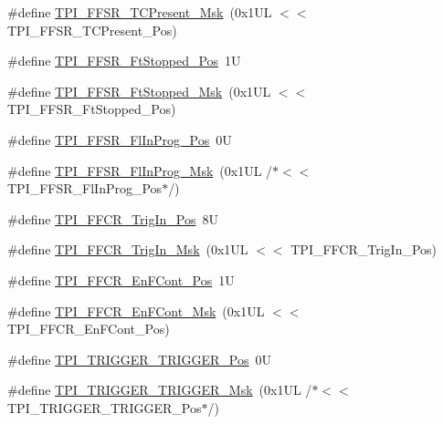 \begin{DoxyCompactItemize}
\item 
\#define \hyperlink{group___c_m_s_i_s___t_p_i_ga0d6bfd263ff2fdec72d6ec9415fb1135}{T\+P\+I\+\_\+\+F\+F\+S\+R\+\_\+\+T\+C\+Present\+\_\+\+Msk}~(0x1\+U\+L $<$$<$ T\+P\+I\+\_\+\+F\+F\+S\+R\+\_\+\+T\+C\+Present\+\_\+\+Pos)
\item 
\#define \hyperlink{group___c_m_s_i_s___t_p_i_gaedf31fd453a878021b542b644e2869d2}{T\+P\+I\+\_\+\+F\+F\+S\+R\+\_\+\+Ft\+Stopped\+\_\+\+Pos}~1U
\item 
\#define \hyperlink{group___c_m_s_i_s___t_p_i_ga1ab6c3abe1cf6311ee07e7c479ce5f78}{T\+P\+I\+\_\+\+F\+F\+S\+R\+\_\+\+Ft\+Stopped\+\_\+\+Msk}~(0x1\+U\+L $<$$<$ T\+P\+I\+\_\+\+F\+F\+S\+R\+\_\+\+Ft\+Stopped\+\_\+\+Pos)
\item 
\#define \hyperlink{group___c_m_s_i_s___t_p_i_ga542ca74a081588273e6d5275ba5da6bf}{T\+P\+I\+\_\+\+F\+F\+S\+R\+\_\+\+Fl\+In\+Prog\+\_\+\+Pos}~0U
\item 
\#define \hyperlink{group___c_m_s_i_s___t_p_i_ga63dfb09259893958962914fc3a9e3824}{T\+P\+I\+\_\+\+F\+F\+S\+R\+\_\+\+Fl\+In\+Prog\+\_\+\+Msk}~(0x1\+U\+L /$\ast$$<$$<$ T\+P\+I\+\_\+\+F\+F\+S\+R\+\_\+\+Fl\+In\+Prog\+\_\+\+Pos$\ast$/)
\item 
\#define \hyperlink{group___c_m_s_i_s___t_p_i_gaa7ea11ba6ea75b541cd82e185c725b5b}{T\+P\+I\+\_\+\+F\+F\+C\+R\+\_\+\+Trig\+In\+\_\+\+Pos}~8U
\item 
\#define \hyperlink{group___c_m_s_i_s___t_p_i_ga360b413bc5da61f751546a7133c3e4dd}{T\+P\+I\+\_\+\+F\+F\+C\+R\+\_\+\+Trig\+In\+\_\+\+Msk}~(0x1\+U\+L $<$$<$ T\+P\+I\+\_\+\+F\+F\+C\+R\+\_\+\+Trig\+In\+\_\+\+Pos)
\item 
\#define \hyperlink{group___c_m_s_i_s___t_p_i_ga99e58a0960b275a773b245e2b69b9a64}{T\+P\+I\+\_\+\+F\+F\+C\+R\+\_\+\+En\+F\+Cont\+\_\+\+Pos}~1U
\item 
\#define \hyperlink{group___c_m_s_i_s___t_p_i_ga27d1ecf2e0ff496df03457a2a97cb2c9}{T\+P\+I\+\_\+\+F\+F\+C\+R\+\_\+\+En\+F\+Cont\+\_\+\+Msk}~(0x1\+U\+L $<$$<$ T\+P\+I\+\_\+\+F\+F\+C\+R\+\_\+\+En\+F\+Cont\+\_\+\+Pos)
\item 
\#define \hyperlink{group___c_m_s_i_s___t_p_i_ga5517fa2ced64efbbd413720329c50b99}{T\+P\+I\+\_\+\+T\+R\+I\+G\+G\+E\+R\+\_\+\+T\+R\+I\+G\+G\+E\+R\+\_\+\+Pos}~0U
\item 
\#define \hyperlink{group___c_m_s_i_s___t_p_i_ga814227af2b2665a0687bb49345e21110}{T\+P\+I\+\_\+\+T\+R\+I\+G\+G\+E\+R\+\_\+\+T\+R\+I\+G\+G\+E\+R\+\_\+\+Msk}~(0x1\+U\+L /$\ast$$<$$<$ T\+P\+I\+\_\+\+T\+R\+I\+G\+G\+E\+R\+\_\+\+T\+R\+I\+G\+G\+E\+R\+\_\+\+Pos$\ast$/)
\item 

\end{DoxyCompactItemize}
